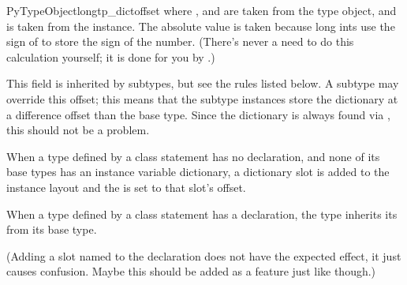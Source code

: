 \begin{cmemberdesc}{PyTypeObject}{long}{tp_dictoffset}
  where ,  and
   are taken from the type object, and
   is taken from the instance.  The absolute value is
  taken because long ints use the sign of  to store
  the sign of the number.  (There's never a need to do this
  calculation yourself; it is done for you by
  .)

  This field is inherited by subtypes, but see the rules listed below.
  A subtype may override this offset; this means that the subtype
  instances store the dictionary at a difference offset than the base
  type.  Since the dictionary is always found via
  , this should not be a problem.

  When a type defined by a class statement has no 
  declaration, and none of its base types has an instance variable
  dictionary, a dictionary slot is added to the instance layout and
  the  is set to that slot's offset.

  When a type defined by a class statement has a 
  declaration, the type inherits its  from its
  base type.

  (Adding a slot named  to the 
  declaration does not have the expected effect, it just causes
  confusion.  Maybe this should be added as a feature just like
   though.)
\end{cmemberdesc}

